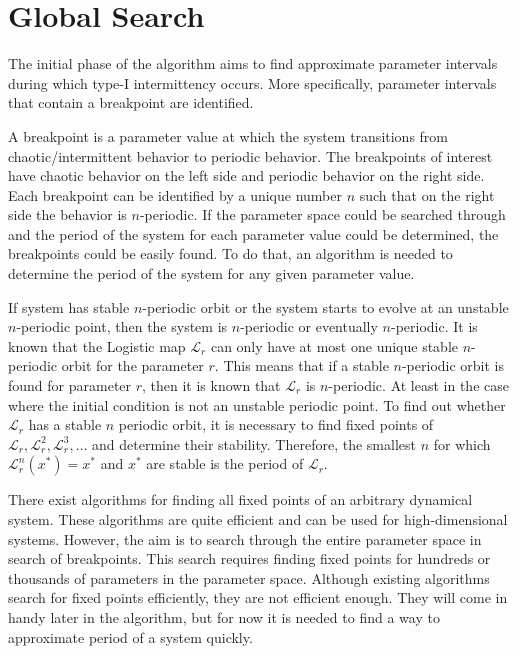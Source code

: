 \section{Global Search}
\label{sec:globsearch}
The initial phase of the algorithm aims to find approximate parameter intervals during which type-I intermittency occurs.
More specifically, parameter intervals that contain a breakpoint are identified.
\par
A breakpoint is a parameter value at which the system transitions from chaotic/intermittent behavior to periodic behavior.
The breakpoints of interest have chaotic behavior on the left side and periodic behavior on the right side.
Each breakpoint can be identified by a unique number $n$ such that on the right side the behavior is $n$-periodic.
If the parameter space could be searched through and the period of the system for each parameter value could be determined, the breakpoints could be easily found.
To do that, an algorithm is needed to determine the period of the system for any given parameter value.
\par
If system has stable $n$-periodic orbit or the system starts to evolve at an unstable $n$-periodic point, then the system is $n$-periodic or eventually $n$-periodic.
It is known that the Logistic map $\mathcal{L}_r$ can only have at most one unique stable $n$-periodic orbit for the parameter $r$.
This means that if a stable $n$-periodic orbit is found for parameter $r$, then it is known that $\mathcal{L}_r$ is $n$-periodic.
At least in the case where the initial condition is not an unstable periodic point.
To find out whether $\mathcal{L}_r$ has a stable $n$ periodic orbit, it is necessary to find fixed points of $\mathcal{L}_r, \mathcal{L}_{r}^{2}, \mathcal{L}_{r}^{3}, \dots$ and determine their stability.
Therefore, the smallest $n$ for which $\mathcal{L}_{r}^{n}(x^{*})=x^{*}$ and $x^{*}$ are stable is the period of $\mathcal{L}_r$.
\par
There exist algorithms for finding all fixed points of an arbitrary dynamical system.
These algorithms are quite efficient and can be used for high-dimensional systems.
However, the aim is to search through the entire parameter space in search of breakpoints.
This search requires finding fixed points for hundreds or thousands of parameters in the parameter space.
Although existing algorithms search for fixed points efficiently, they are not efficient enough.
They will come in handy later in the algorithm, but for now it is needed to find a way to approximate period of a system quickly.
\par

